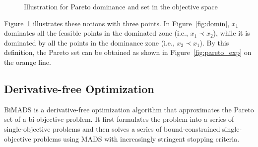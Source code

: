 \documentclass[11pt,oneside,onecolumn,openright]{article}
\begin{document}
    \begin{figure}[htp] 
    \centering 
          \hspace{0.3cm} 
          \caption{Illustration for Pareto dominance and set in the objective space} 
            \label{fig:pare_ill}
    \end{figure}

     Figure~\ref{fig:pare_ill} illustrates these notions with three points. In Figure~\ref{fig:domin}, $x_1$ dominates all the feasible points in the dominated zone (i.e., $x_1\prec x_2$), while it is dominated by all the points in the dominance zone (i.e., $x_3\prec x_1$). By this definition, the Pareto set can be obtained as shown in Figure~\ref{fig:pareto_exp} on the orange line.


  \subsection{Derivative-free Optimization}
    BiMADS is a derivative-free optimization algorithm that approximates the Pareto set of a bi-objective problem. It first formulates the problem into a series of single-objective problems and then solves a series of bound-constrained single-objective problems using MADS with increasingly stringent stopping criteria.
\end{document}
